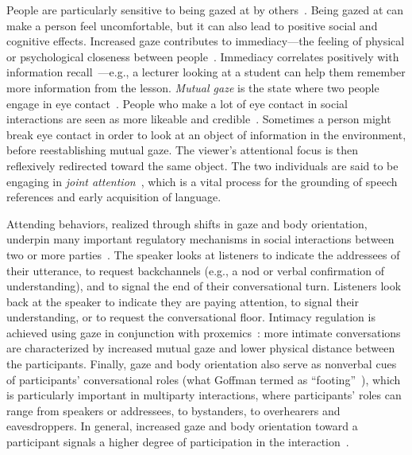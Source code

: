 People are particularly sensitive to being gazed at by others~\citep{argyle1976gaze}. Being gazed at can make a person feel uncomfortable, but it can also lead to positive social and cognitive effects. Increased gaze contributes to immediacy---the feeling of physical or psychological closeness between people~\citep{mehrabian1966immediacy}. Immediacy correlates positively with information recall~\citep{otteson1980effect,sherwood1987facilitative,fullwood2006effect,kelley1988effects}---e.g., a lecturer looking at a student can help them remember more information from the lesson.
\emph{Mutual gaze} is the state where two people engage in eye contact~\citep{argyle1976gaze}. People who make a lot of eye contact in social interactions are seen as more likeable and credible~\citep{beebe1976effects,argyle1976gaze}. Sometimes a person might break eye contact in order to look at an object of information in the environment, before reestablishing mutual gaze. The viewer's attentional focus is then reflexively redirected toward the same object. The two individuals are said to be engaging in \emph{joint attention}~\citep{moore2014joint}, which is a vital process for the grounding of speech references and early acquisition of language.

Attending behaviors, realized through shifts in gaze and body orientation, underpin many important regulatory mechanisms in social interactions between two or more parties~\citep{kendon1967some,heylen2006head}. The speaker looks at listeners to indicate the addressees of their utterance, to request backchannels (e.g., a nod or verbal confirmation of understanding), and to signal the end of their conversational turn. Listeners look back at the speaker to indicate they are paying attention, to signal their understanding, or to request the conversational floor. Intimacy regulation is achieved using gaze in conjunction with proxemics~\citep{argyle1965eyecontact}: more intimate conversations are characterized by increased mutual gaze and lower physical distance between the participants. Finally, gaze and body orientation also serve as nonverbal cues of participants' conversational roles (what Goffman termed as ``footing''~\citep{goffman1979footing}), which is particularly important in multiparty interactions, where participants' roles can range from speakers or addressees, to bystanders, to overhearers and eavesdroppers. In general, increased gaze and body orientation toward a participant signals a higher degree of participation in the interaction~\citep{mutlu2012conversational}.

